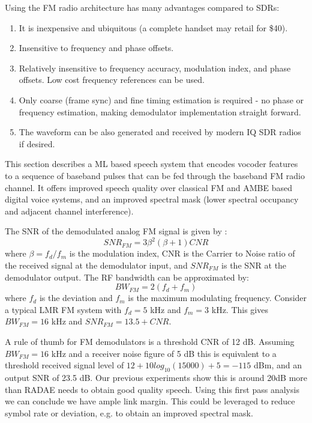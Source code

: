 \documentclass{article}
\begin{document}
Using the FM radio architecture has many advantages compared to SDRs:
\begin{enumerate}
\item It is inexpensive and ubiquitous (a complete handset may retail for \$40).
\item Insensitive to frequency and phase offsets.
\item Relatively insensitive to frequency accuracy, modulation index, and phase offsets. Low cost frequency references can be used.
\item Only coarse (frame sync) and fine timing estimation is required - no phase or frequency estimation, making demodulator implementation straight forward.
\item The waveform can be also generated and received by modern IQ SDR radios if desired.
\end{enumerate}

This section describes a ML based speech system that encodes vocoder features to a sequence of baseband pulses that can be fed through the baseband FM radio channel.  It offers improved speech quality over classical FM and AMBE based digital voice systems, and an improved spectral mask (lower spectral occupancy and adjacent channel interference). 

The SNR of the demodulated analog FM signal is given by \cite{der_fmtutorial}:
\begin{equation}
SNR_{FM} = 3\beta^2(\beta+1) CNR
\end{equation}
where $\beta=f_d / f_m$ is the modulation index, CNR is the Carrier to Noise ratio of the received signal at the demodulator input, and $SNR_{FM}$ is the SNR at the demodulator output. The RF bandwidth can be approximated by:
\begin{equation}
BW_{FM} = 2(f_d+f_m)
\end{equation}
where $f_d$ is the deviation and $f_m$ is the maximum modulating frequency.  Consider a typical LMR FM system with $f_d=5$ kHz and $f_m=3$ kHz.  This gives $BW_{FM}=16$ kHz and $SNR_{FM}=13.5+CNR$.

A rule of thumb for FM demodulators is a threshold CNR of 12 dB. Assuming $BW_{FM}=16$ kHz and a receiver noise figure of 5 dB this is equivalent to a threshold received signal level of $12 + 10log_{10}(15000) + 5  = -115$ dBm, and an output SNR of 23.5 dB. Our previous experiments show this is around 20dB more than RADAE needs to obtain good quality speech.  Using this first pass analysis we can conclude we have ample link margin.  This could be leveraged to reduce symbol rate or deviation, e.g. to obtain an improved spectral mask.
\end{document}
